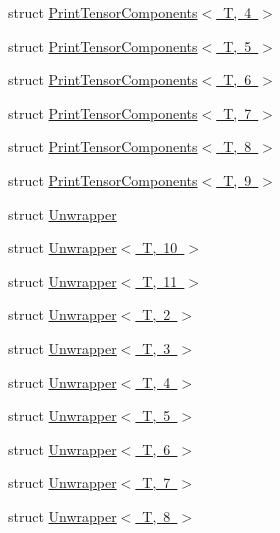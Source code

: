 \begin{DoxyCompactItemize}
\item 
struct \mbox{\hyperlink{structmpc_1_1utilities_1_1_print_tensor_components_3_01_t_00_014_01_4}{Print\+Tensor\+Components$<$ T, 4 $>$}}
\item 
struct \mbox{\hyperlink{structmpc_1_1utilities_1_1_print_tensor_components_3_01_t_00_015_01_4}{Print\+Tensor\+Components$<$ T, 5 $>$}}
\item 
struct \mbox{\hyperlink{structmpc_1_1utilities_1_1_print_tensor_components_3_01_t_00_016_01_4}{Print\+Tensor\+Components$<$ T, 6 $>$}}
\item 
struct \mbox{\hyperlink{structmpc_1_1utilities_1_1_print_tensor_components_3_01_t_00_017_01_4}{Print\+Tensor\+Components$<$ T, 7 $>$}}
\item 
struct \mbox{\hyperlink{structmpc_1_1utilities_1_1_print_tensor_components_3_01_t_00_018_01_4}{Print\+Tensor\+Components$<$ T, 8 $>$}}
\item 
struct \mbox{\hyperlink{structmpc_1_1utilities_1_1_print_tensor_components_3_01_t_00_019_01_4}{Print\+Tensor\+Components$<$ T, 9 $>$}}
\item 
struct \mbox{\hyperlink{structmpc_1_1utilities_1_1_unwrapper}{Unwrapper}}
\item 
struct \mbox{\hyperlink{structmpc_1_1utilities_1_1_unwrapper_3_01_t_00_0110_01_4}{Unwrapper$<$ T, 10 $>$}}
\item 
struct \mbox{\hyperlink{structmpc_1_1utilities_1_1_unwrapper_3_01_t_00_0111_01_4}{Unwrapper$<$ T, 11 $>$}}
\item 
struct \mbox{\hyperlink{structmpc_1_1utilities_1_1_unwrapper_3_01_t_00_012_01_4}{Unwrapper$<$ T, 2 $>$}}
\item 
struct \mbox{\hyperlink{structmpc_1_1utilities_1_1_unwrapper_3_01_t_00_013_01_4}{Unwrapper$<$ T, 3 $>$}}
\item 
struct \mbox{\hyperlink{structmpc_1_1utilities_1_1_unwrapper_3_01_t_00_014_01_4}{Unwrapper$<$ T, 4 $>$}}
\item 
struct \mbox{\hyperlink{structmpc_1_1utilities_1_1_unwrapper_3_01_t_00_015_01_4}{Unwrapper$<$ T, 5 $>$}}
\item 
struct \mbox{\hyperlink{structmpc_1_1utilities_1_1_unwrapper_3_01_t_00_016_01_4}{Unwrapper$<$ T, 6 $>$}}
\item 
struct \mbox{\hyperlink{structmpc_1_1utilities_1_1_unwrapper_3_01_t_00_017_01_4}{Unwrapper$<$ T, 7 $>$}}
\item 
struct \mbox{\hyperlink{structmpc_1_1utilities_1_1_unwrapper_3_01_t_00_018_01_4}{Unwrapper$<$ T, 8 $>$}}
\item 

\end{DoxyCompactItemize}
